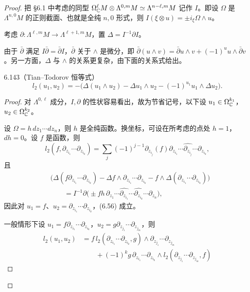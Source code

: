 \begin{proof}
  把 §6.1 中考虑的同型 $\Omega^\ell_{\mathbb{C}}M\otimes\Lambda^{0,m}M\simeq\Lambda^{n-\ell,m}M$ 记作 $I$。即设 $\Omega$ 是 $\Lambda^{n,0}M$ 的正则截面、也就是全纯 $n,0$ 形式，则 $I(\xi\otimes u)=\pm i_\xi\Omega\wedge u$。

  考虑 $\partial\colon\Lambda^{\ell,m}M\to\Lambda^{\ell+1,m}M$，置 $\Delta=I^{-1}\partial I$。

  由于 $\bar\partial$ 满足 $I\bar\partial=\bar\partial I$，$\bar\partial$ 关于 $\wedge$ 是微分，即 $\bar\partial(u\wedge v)=\bar\partial u\wedge v+(-1)^uu\wedge\bar\partial v$。另一方面，$\Delta$ 与 $\wedge$ 的关系更复杂，由下面的关系式给出。

  \begin{lemma}{6.143（Tian–Todorov 恒等式）}
    \begin{equation}
      l_2(u_1,u_2)=-\bigl(\Delta(u_1\wedge u_2)-\Delta u_1\wedge u_2-(-1)^{u_1}u_1\wedge\Delta u_2\bigr). \tag{6.56}
    \end{equation}
  \end{lemma}

  \begin{proof}
    对 $\Lambda^{0,\ell}$ 成分，$I,\partial$ 的性状容易看出，故为节省记号，以下设 $u_1\in\Omega^{k_1}_{\mathbb{C}}$，$u_2\in\Omega^{k_2}_{\mathbb{C}}$。

    设 $\Omega=h\,dz_1\cdots dz_n$，则 $h$ 是全纯函数。换坐标，可设在所考虑的点处 $h=1$，$dh=0$。设 $f$ 是函数，则
    \[
      l_2(f,\partial_{z_{i_1}}\cdots\partial_{z_{i_k}})
      =\sum_j(-1)^{j-1}\partial_{z_{i_j}}(f)\partial_{z_{i_1}}\cdots\widehat{\partial_{z_{i_j}}}\cdots\partial_{z_{i_k}},
    \]
    且
    \begin{align*}
      &\bigl(\Delta(f\partial_{z_{i_1}}\cdots\partial_{z_{i_k}})-\Delta f\wedge\partial_{z_{i_1}}\cdots\partial_{z_{i_k}}
      -f\wedge\Delta(\partial_{z_{i_1}}\cdots\partial_{z_{i_k}})\bigr)\\
      &\qquad=I^{-1}\partial\bigl(\pm fh\,\partial_{z_1}\cdots\widehat{\partial_{z_{i_1}}}\cdots
      \widehat{\partial_{z_{i_k}}}\cdots\partial_{z_n}\bigr),
    \end{align*}
    因此对 $u_1=f$、$u_2=\partial_{z_{i_1}}\cdots\partial_{z_{i_k}}$，(6.56) 成立。

    一般情形下设 $u_1=f\partial_{z_{i_1}}\cdots\partial_{z_{i_k}}$，$u_2=g\partial_{z_{j_1}}\cdots\partial_{z_{j_m}}$，则
    \begin{align*}
      l_2(u_1,u_2)&=f\,l_2(\partial_{z_{i_1}}\cdots\partial_{z_{i_k}},g)\wedge\partial_{z_{j_1}}\cdots\partial_{z_{j_m}}\\
      &\qquad+(-1)^kg\,\partial_{z_{i_1}}\cdots\partial_{z_{i_k}}\wedge l_2(\partial_{z_{j_1}}\cdots\partial_{z_{j_m}},f)
    \end{align*}


\end{proof}
\end{proof}
